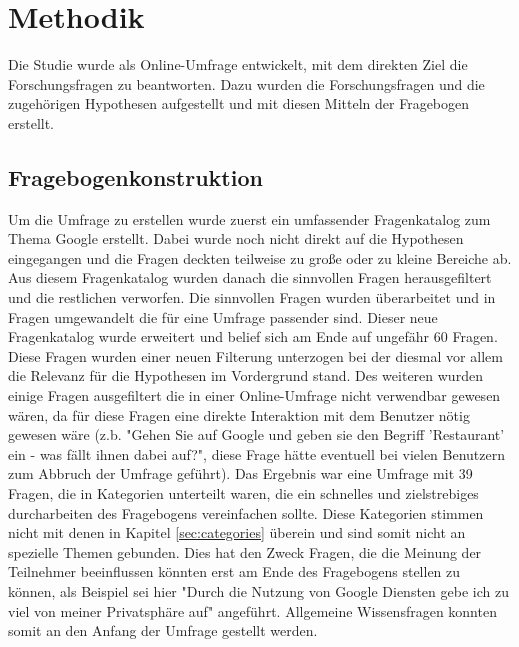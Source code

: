 %
% 

\chapter{Methodik}

Die Studie wurde als Online-Umfrage entwickelt, mit dem direkten Ziel die Forschungsfragen zu beantworten. Dazu wurden die Forschungsfragen und die zugehörigen Hypothesen aufgestellt und mit diesen Mitteln der Fragebogen erstellt.

\section{Fragebogenkonstruktion}
Um die Umfrage zu erstellen wurde zuerst ein umfassender Fragenkatalog zum Thema Google erstellt. Dabei wurde noch nicht direkt auf die Hypothesen eingegangen und die Fragen deckten teilweise zu große oder zu kleine Bereiche ab. Aus diesem Fragenkatalog wurden danach die sinnvollen Fragen herausgefiltert und die restlichen verworfen. Die sinnvollen Fragen wurden überarbeitet und in Fragen umgewandelt die für eine Umfrage passender sind. Dieser neue Fragenkatalog wurde erweitert und belief sich am Ende auf ungefähr 60 Fragen.
Diese Fragen wurden einer neuen Filterung unterzogen bei der diesmal vor allem die Relevanz für die Hypothesen im Vordergrund stand. Des weiteren wurden einige Fragen ausgefiltert die in einer Online-Umfrage nicht verwendbar gewesen wären, da für diese Fragen eine direkte Interaktion mit dem Benutzer nötig gewesen wäre (z.b. "Gehen Sie auf Google und geben sie den Begriff 'Restaurant' ein - was fällt ihnen dabei auf?", diese Frage hätte eventuell bei vielen Benutzern zum Abbruch der Umfrage geführt). Das Ergebnis war eine Umfrage mit 39 Fragen, die in Kategorien unterteilt waren, die ein schnelles und zielstrebiges durcharbeiten des Fragebogens vereinfachen sollte. Diese Kategorien stimmen nicht mit denen in Kapitel \ref{sec:categories} überein und sind somit nicht an spezielle Themen gebunden. Dies hat den Zweck Fragen, die die Meinung der Teilnehmer beeinflussen könnten erst am Ende des Fragebogens stellen zu können, als Beispiel sei hier "Durch die Nutzung von Google Diensten gebe ich zu viel von meiner Privatsphäre auf" angeführt. Allgemeine Wissensfragen konnten somit an den Anfang der Umfrage gestellt werden.\\
